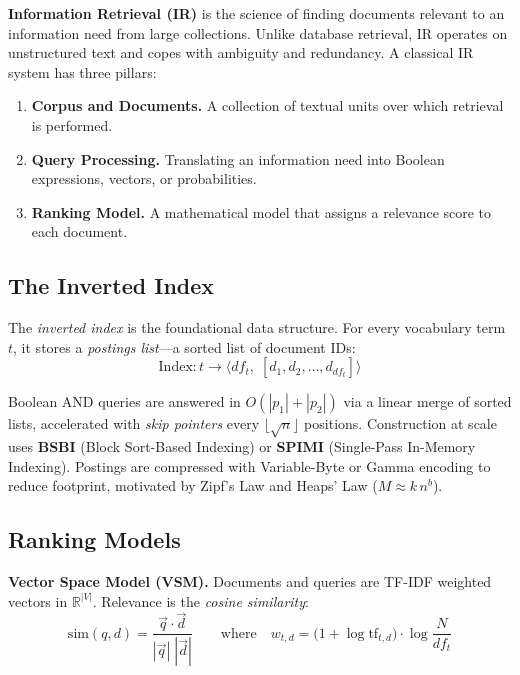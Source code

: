 \documentclass[11pt,a4paper]{article}
\begin{document}
\textbf{Information Retrieval (IR)} is the science of finding documents relevant to an information need from large collections. Unlike database retrieval, IR operates on unstructured text and copes with ambiguity and redundancy. A classical IR system has three pillars:
\begin{enumerate}[leftmargin=*, label=\arabic*., nosep]
  \item \textbf{Corpus and Documents.} A collection of textual units over which retrieval is performed.
  \item \textbf{Query Processing.} Translating an information need into Boolean expressions, vectors, or probabilities.
  \item \textbf{Ranking Model.} A mathematical model that assigns a relevance score to each document.
\end{enumerate}

\subsection{The Inverted Index}
The \emph{inverted index} is the foundational data structure. For every vocabulary term $t$, it stores a \emph{postings list}—a sorted list of document IDs:
\vspace{-0.5em}
\begin{equation}
  \text{Index}: t \longrightarrow \langle df_t,\;[d_1, d_2, \ldots, d_{df_t}] \rangle
\end{equation}
\vspace{-0.5em}

Boolean AND queries are answered in $O(|p_1| + |p_2|)$ via a linear merge of sorted lists, accelerated with \emph{skip pointers} every $\lfloor\sqrt{n}\rfloor$ positions. Construction at scale uses \textbf{BSBI} (Block Sort-Based Indexing) or \textbf{SPIMI} (Single-Pass In-Memory Indexing). Postings are compressed with Variable-Byte or Gamma encoding to reduce footprint, motivated by Zipf's Law and Heaps' Law ($M \approx k\,n^b$).

\subsection{Ranking Models}

\textbf{Vector Space Model (VSM).} Documents and queries are TF-IDF weighted vectors in $\mathbb{R}^{|V|}$. Relevance is the \emph{cosine similarity}:
\vspace{-0.5em}
\begin{equation}
  \text{sim}(q, d) = \frac{\vec{q} \cdot \vec{d}}{|\vec{q}|\;|\vec{d}|} \qquad \text{where}\quad w_{t,d} = \bigl(1 + \log \text{tf}_{t,d}\bigr)\cdot\log\frac{N}{df_t}
\end{equation}
\vspace{-0.5em}
\end{document}
